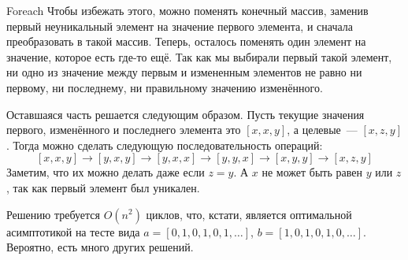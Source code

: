 \begin{tutorial}{Foreach}
Чтобы избежать этого, можно поменять конечный массив, заменив первый неуникальный элемент на значение первого элемента, и сначала преобразовать в такой массив.
Теперь, осталось поменять один элемент на значение, которое есть где-то ещё.
Так как мы выбирали первый такой элемент, ни одно из значение между первым и измененным элементов не равно ни первому, ни последнему, ни правильному значению изменённого.

Оставшаяся часть решается следующим образом. Пусть текущие значения первого, изменённого и последнего элемента это $[x, x, y]$, а целевые~--- $[x, z, y]$.
Тогда можно сделать следующую последовательность операций: $$[x, x, y] \rightarrow [y, x, y] \rightarrow [y, x, x] \rightarrow [y, y, x] \rightarrow [x, y, y] \rightarrow [x, z, y]$$
Заметим, что их можно делать даже если $z = y$. А $x$ не может быть равен  $y$ или $z$, так как первый элемент был уникален.

Решению требуется $O(n^2)$ циклов, что, кстати, является оптимальной асимптотикой на тесте вида $a = [0, 1, 0, 1, 0, 1, \dots]$, $b = [1, 0, 1, 0, 1, 0, \dots]$. Вероятно, есть много других решений.

\end{tutorial}
